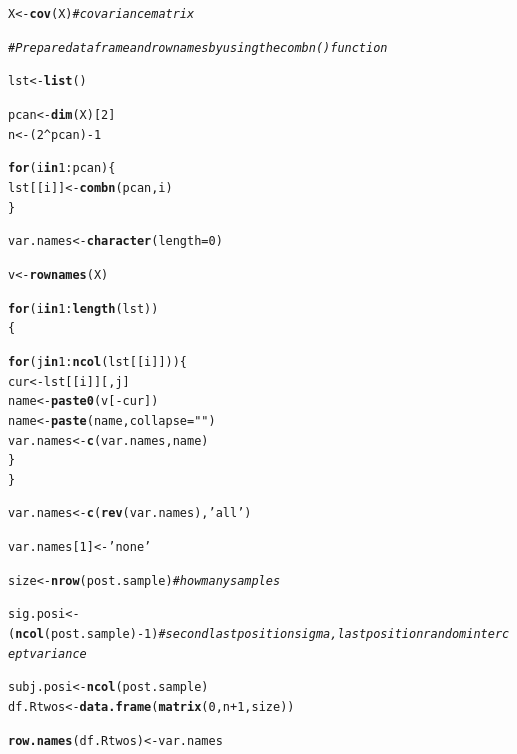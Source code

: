 \documentclass[11pt,a4paper,twoside]{book}\usepackage[]{graphicx}\usepackage[]{color}
\makeatletter
\newcommand{\hlnum}[1]{\textcolor[rgb]{0.686,0.059,0.569}{#1}}%
\newcommand{\hlstr}[1]{\textcolor[rgb]{0.192,0.494,0.8}{#1}}%
\newcommand{\hlcom}[1]{\textcolor[rgb]{0.678,0.584,0.686}{\textit{#1}}}%
\newcommand{\hlopt}[1]{\textcolor[rgb]{0,0,0}{#1}}%
\newcommand{\hlstd}[1]{\textcolor[rgb]{0.345,0.345,0.345}{#1}}%
\newcommand{\hlkwa}[1]{\textcolor[rgb]{0.161,0.373,0.58}{\textbf{#1}}}%
\newcommand{\hlkwb}[1]{\textcolor[rgb]{0.69,0.353,0.396}{#1}}%
\newcommand{\hlkwc}[1]{\textcolor[rgb]{0.333,0.667,0.333}{#1}}%
\newcommand{\hlkwd}[1]{\textcolor[rgb]{0.737,0.353,0.396}{\textbf{#1}}}%
\newenvironment{kframe}{%
 \def\at@end@of@kframe{}%
 \ifinner\ifhmode%
  \def\at@end@of@kframe{\end{minipage}}%
  \begin{minipage}{\columnwidth}%
 \fi\fi%
 \def\FrameCommand##1{\hskip\@totalleftmargin \hskip-\fboxsep
 \colorbox{shadecolor}{##1}\hskip-\fboxsep
     \hskip-\linewidth \hskip-\@totalleftmargin \hskip\columnwidth}%
 \MakeFramed {\advance\hsize-\width
   \@totalleftmargin\z@ \linewidth\hsize
   \@setminipage}}%
 {\par\unskip\endMakeFramed%
 \at@end@of@kframe}
\newenvironment{knitrout}{}{} %
\makeatother
\begin{document}
\begin{knitrout}
\begin{kframe}
\begin{alltt}
        \hlstd{X} \hlkwb{<-} \hlkwd{cov}\hlstd{(X)} \hlcom{#covariance matrix}

        \hlcom{#Prepare data frame and rownames by using the combn() function}

        \hlstd{lst} \hlkwb{<-} \hlkwd{list}\hlstd{()}

        \hlstd{pcan} \hlkwb{<-} \hlkwd{dim}\hlstd{(X)[}\hlnum{2}\hlstd{]}
        \hlstd{n} \hlkwb{<-} \hlstd{(}\hlnum{2}\hlopt{^}\hlstd{pcan)}\hlopt{-}\hlnum{1}

        \hlkwa{for} \hlstd{(i} \hlkwa{in} \hlnum{1}\hlopt{:}\hlstd{pcan)\{}
                \hlstd{lst[[i]]} \hlkwb{<-} \hlkwd{combn}\hlstd{(pcan,i)}
        \hlstd{\}}

        \hlstd{var.names} \hlkwb{<-} \hlkwd{character}\hlstd{(}\hlkwc{length} \hlstd{=} \hlnum{0}\hlstd{)}

        \hlstd{v}\hlkwb{<-} \hlkwd{rownames}\hlstd{(X)}


        \hlkwa{for}\hlstd{(i} \hlkwa{in} \hlnum{1}\hlopt{:}\hlkwd{length}\hlstd{(lst))}
        \hlstd{\{}

                \hlkwa{for} \hlstd{(j} \hlkwa{in} \hlnum{1}\hlopt{:}\hlkwd{ncol}\hlstd{(lst[[i]]))\{}
                        \hlstd{cur}\hlkwb{<-} \hlstd{lst[[i]][,j]}
                        \hlstd{name} \hlkwb{<-} \hlkwd{paste0}\hlstd{(v[}\hlopt{-}\hlstd{cur])}
                        \hlstd{name} \hlkwb{<-} \hlkwd{paste}\hlstd{(name,} \hlkwc{collapse} \hlstd{=} \hlstr{" "}\hlstd{)}
                        \hlstd{var.names} \hlkwb{<-} \hlkwd{c}\hlstd{(var.names, name)}
                \hlstd{\}}
        \hlstd{\}}

        \hlstd{var.names}\hlkwb{<-}\hlkwd{c}\hlstd{(}\hlkwd{rev}\hlstd{(var.names),} \hlstr{'all'}\hlstd{)}

        \hlstd{var.names[}\hlnum{1}\hlstd{]}\hlkwb{<-}\hlstr{'none'}

        \hlstd{size} \hlkwb{<-} \hlkwd{nrow}\hlstd{(post.sample)}  \hlcom{# how many samples}

        \hlstd{sig.posi} \hlkwb{<-} \hlstd{(}\hlkwd{ncol}\hlstd{(post.sample)}\hlopt{-}\hlnum{1}\hlstd{)} \hlcom{# second last position sigma, last position random intercept variance}

        \hlstd{subj.posi} \hlkwb{<-} \hlkwd{ncol}\hlstd{(post.sample)}
        \hlstd{df.Rtwos}\hlkwb{<-}\hlkwd{data.frame}\hlstd{(}\hlkwd{matrix}\hlstd{(}\hlnum{0}\hlstd{,n}\hlopt{+}\hlnum{1}\hlstd{,size))}

        \hlkwd{row.names}\hlstd{(df.Rtwos)} \hlkwb{<-} \hlstd{var.names}


\end{alltt}
\end{kframe}
\end{knitrout}
\end{document}
